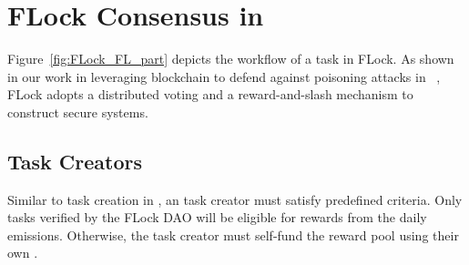 \documentclass[conference]{IEEEtran}
\begin{document}
\section{FLock Consensus in \FL}
Figure~\ref{fig:FLock_FL_part} depicts the workflow of a \FL task in FLock. As shown in our work in leveraging blockchain to defend against poisoning attacks in \FL~\cite{dong2023defending}, FLock adopts a distributed voting and a reward-and-slash mechanism to construct secure \FL systems.




\subsection{Task Creators}
Similar to task creation in \SNT, an \FL task creator must satisfy predefined criteria. Only \FL tasks verified by the FLock DAO will be eligible for rewards from the daily emissions. Otherwise, the \FL task creator must self-fund the reward pool using their own \FML.


\end{document}
